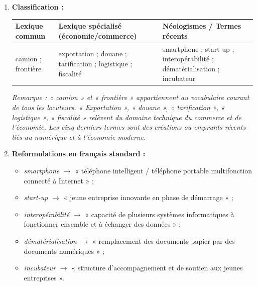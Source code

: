 \documentclass[11pt]{article}
\begin{document}
\begin{corrige}
\begin{enumerate}
    \item \textbf{Classification :}
\begin{center}
\begin{tabularx}{\linewidth}{|X|X|X|}
\hline
\rowcolor{popblueL} \textbf{Lexique commun} & \textbf{Lexique spécialisé (économie/commerce)} & \textbf{Néologismes / Termes récents} \\
\hline
camion ; frontière & exportation ; douane ; tarification ; logistique ; fiscalité & smartphone ; start-up ; interopérabilité ; dématérialisation ; incubateur \\
\hline
\end{tabularx}
\end{center}
\textit{Remarque : « camion » et « frontière » appartiennent au vocabulaire courant de tous les locuteurs. « Exportation », « douane », « tarification », « logistique », « fiscalité » relèvent du domaine technique du commerce et de l'économie. Les cinq derniers termes sont des créations ou emprunts récents liés au numérique et à l'économie moderne.}
    \item \textbf{Reformulations en français standard :}
\begin{itemize}
    \item \emph{smartphone} $\rightarrow$ « téléphone intelligent / téléphone portable multifonction connecté à Internet » ;
    \item \emph{start-up} $\rightarrow$ « jeune entreprise innovante en phase de démarrage » ;
    \item \emph{interopérabilité} $\rightarrow$ « capacité de plusieurs systèmes informatiques à fonctionner ensemble et à échanger des données » ;
    \item \emph{dématérialisation} $\rightarrow$ « remplacement des documents papier par des documents numériques » ;
    \item \emph{incubateur} $\rightarrow$ « structure d'accompagnement et de soutien aux jeunes entreprises ».
\end{itemize}
\end{enumerate}
\end{corrige}
\end{document}
